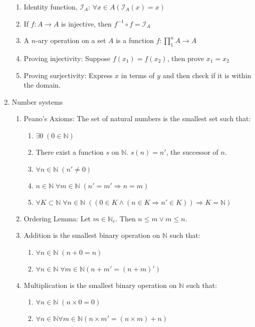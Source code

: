 \documentclass[11pt, twocolumn]{article}
\theoremstyle{definition} \newtheorem*{solution}{Solution}
\begin{document}
\begin{enumerate}
\begin{enumerate}
\item Identity function, $\mathcal{I}_A$: $\forall x \in A (\mathcal{I}_A(x)=x)$ 
\item If $f: A \rightarrow A$ is injective, then $f^{-1} \circ f = \mathcal{I}_A$
\item A $n$-ary operation on a set $A$ is a function $f: \prod^n_1A\rightarrow A$
\item Proving injectivity: Suppose $f(x_1)=f(x_2)$, then prove $x_1=x_2$
\item Proving surjectivity: Express $x$ in terms of $y$ and then check if it is within the domain.
\end{enumerate}
\item Number systems
\begin{enumerate}
\item Peano's Axioms: The set of natural numbers is the smallest set such that:
\begin{enumerate}
\item $\exists 0 \; (0 \in \mathbb{N})$
\item There exist a function $s$ on $\mathbb{N}$. $s(n) = n'$, the successor of $n$.
\item $\forall n \in \mathbb{N} \;(n' \neq 0)$
\item $n \in \mathbb{N}\; \forall m \in \mathbb{N} \; (n' = m' \Rightarrow n=m)$
\item $\forall K \subset \mathbb{N} \; \forall n\in \mathbb{N} \;((0\in K \wedge (n \in K \Rightarrow n' \in K))\Rightarrow K = \mathbb{N} )$  
\end{enumerate}
\item Ordering Lemma: Let $m\in \mathbb{N}_c$. Then $n\leq m \vee m\leq n$.
\item Addition is the smallest binary operation on $\mathbb{N}$ such that:
\begin{enumerate}
\item $\forall n \in \mathbb{N} \;(n+0=n)$
\item $ \forall n\in \mathbb{N} \; \forall m\in \mathbb{N} (n+m' = (n+m)')$
\end{enumerate}
\item Multiplication is the smallest binary operation on $\mathbb{N}$ such that:
\begin{enumerate}
\item $\forall n \in \mathbb{N} \; (n\times 0 = 0)$
\item $\forall n \in \mathbb{N} \forall m \in \mathbb{N} (n\times m' = (n\times m)+n)$
\end{enumerate}

\end{enumerate}
\end{enumerate}
\end{document}
